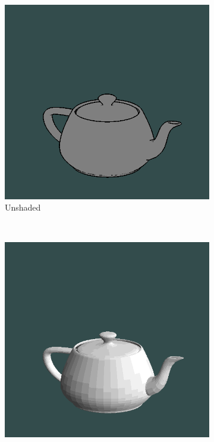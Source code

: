 \begin{figure}[h]
\begin{subfigure}[b]{0.2\textwidth}
        \includegraphics[width=\textwidth]{img/teapot-outline-noshade.png}
        \caption{Unshaded}
        \label{fig:model-noshade}
    \end{subfigure}
    ~
    \begin{subfigure}[b]{0.2\textwidth}
        \includegraphics[width=\textwidth]{img/teapot-model.png}

\end{subfigure}
\end{figure}
